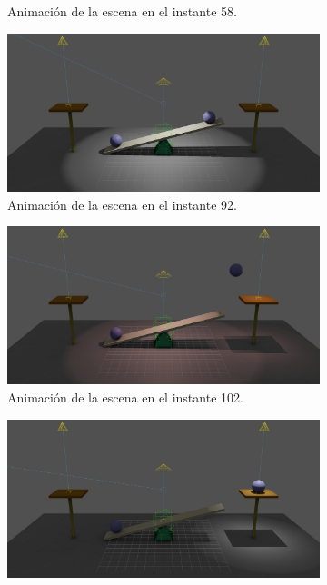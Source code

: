 \documentclass{article}
\begin{document}
\begin{figure}[H]
\begin{subfigure}[t]{0.48\textwidth}
    \caption{Animación de la escena en el instante 58.}
 \end{subfigure}
\hfill
 \begin{subfigure}[t]{0.48\textwidth}
    \centering
    \includegraphics[width=\textwidth]{imagenes/animaciones/general/92.jpg}
    \caption{Animación de la escena en el instante 92.}
 \end{subfigure}
\hfill
 \begin{subfigure}[t]{0.48\textwidth}
    \centering
    \includegraphics[width=\textwidth]{imagenes/animaciones/general/102.jpg}
    \caption{Animación de la escena en el instante 102.}
 \end{subfigure}
\hfill
 \begin{subfigure}[t]{0.48\textwidth}
    \centering
    \includegraphics[width=\textwidth]{imagenes/animaciones/general/112.jpg}

\end{subfigure}
\end{figure}
\end{document}
